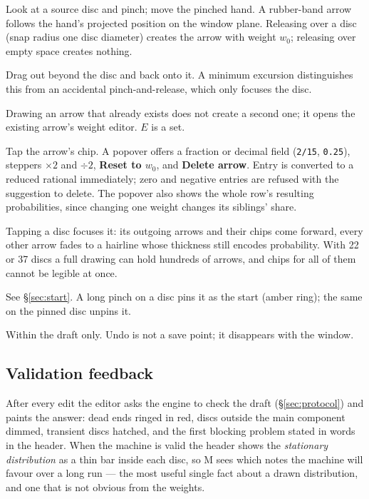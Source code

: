 \documentclass[11pt,a4paper]{article}
\theoremstyle{definition}
\theoremstyle{plain}
\theoremstyle{remark}
\begin{document}
\begin{description}[leftmargin=1cm,style=nextline,itemsep=3pt]
\item[Draw an arrow] Look at a source disc and pinch; move the pinched hand. A rubber-band arrow
  follows the hand's projected position on the window plane. Releasing over a disc (snap radius one
  disc diameter) creates the arrow with weight $w_0$; releasing over empty space creates nothing.
\item[Self-loop] Drag out beyond the disc and back onto it. A minimum excursion distinguishes this
  from an accidental pinch-and-release, which only focuses the disc.
\item[Duplicate] Drawing an arrow that already exists does not create a second one; it opens the
  existing arrow's weight editor. $E$ is a set.
\item[Edit a weight] Tap the arrow's chip. A popover offers a fraction or decimal field (\texttt{2/15},
  \texttt{0.25}), steppers $\times2$ and $\div2$, \textbf{Reset to $w_0$}, and \textbf{Delete arrow}.
  Entry is converted to a reduced rational immediately; zero and negative entries are refused with
  the suggestion to delete. The popover also shows the whole row's resulting probabilities, since
  changing one weight changes its siblings' share.
\item[Focus] Tapping a disc focuses it: its outgoing arrows and their chips come forward, every other
  arrow fades to a hairline whose thickness still encodes probability. With 22 or 37 discs a full
  drawing can hold hundreds of arrows, and chips for all of them cannot be legible at once.
\item[Start disc] See \S\ref{sec:start}. A long pinch on a disc pins it as the start (amber ring);
  the same on the pinned disc unpins it.
\item[Undo] Within the draft only. Undo is not a save point; it disappears with the window.
\end{description}

\subsection{Validation feedback}

After every edit the editor asks the engine to check the draft (\S\ref{sec:protocol}) and paints the
answer: dead ends ringed in red, discs outside the main component dimmed, transient discs hatched,
and the first blocking problem stated in words in the header. When the machine is valid the header
shows the \emph{stationary distribution} as a thin bar inside each disc, so M sees which notes the
machine will favour over a long run --- the most useful single fact about a drawn distribution, and
one that is not obvious from the weights.
\end{document}
